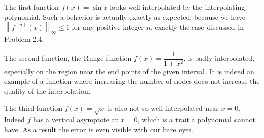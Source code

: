\documentclass{article}
\newcommand{\norm}[1]{\left\lVert#1\right\rVert}
\begin{document}
The first function $f(x) =\sin x$ looks well interpolated by the interpolating polynomial. Such a behavior is actually exactly as expected, because we have $\norm{f^{(n)}(x)}_\infty \leq 1$ for any positive integer $n$, exactly the case discussed in Problem 2.4. \par 
The second function, the Runge function $f(x) = \dfrac{1}{1+x^2}$, is badly interpolated, especially on the region near the end points of the given interval. It is indeed an example of a function where increasing the number of nodes does not increase the quality of the interpolation. \par 
The third function $f(x) = \sqrt{x}$ is also not so well interpolated near $x=0$. Indeed $f$ has a vertical asymptote at $x=0$, which is a trait a polynomial cannot have. As a result the error is even visible with our bare eyes.   
\end{document}
